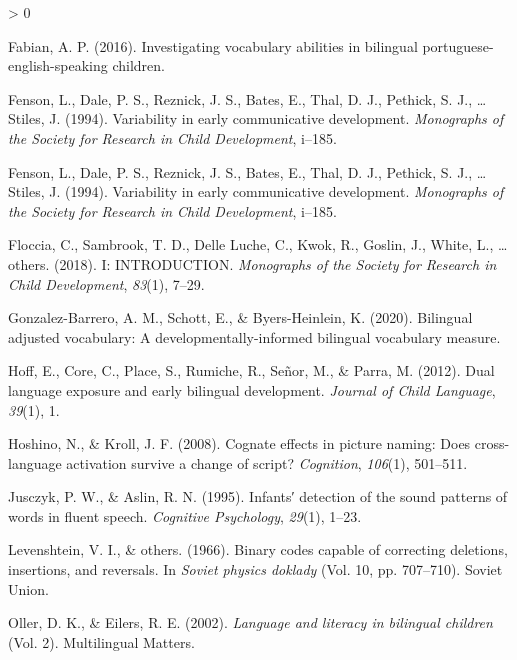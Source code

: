 \documentclass[
  english,
  man,man,floatsintext]{apa6}
\newlength{\cslhangindent}
\newenvironment{CSLReferences}[2] %
 {%
  \setlength{\parindent}{0pt}
  \ifodd #1 \everypar{\setlength{\hangindent}{\cslhangindent}}\ignorespaces\fi
  \ifnum #2 > 0
  \setlength{\parskip}{#2\baselineskip}
  \fi
 }%
 {}
\begin{document}
\begin{CSLReferences}{1}{0}
\leavevmode\hypertarget{ref-fabian2016investigating}{}%
Fabian, A. P. (2016). Investigating vocabulary abilities in bilingual portuguese-english-speaking children.

\leavevmode\hypertarget{ref-fenson1994variability}{}%
Fenson, L., Dale, P. S., Reznick, J. S., Bates, E., Thal, D. J., Pethick, S. J., \ldots{} Stiles, J. (1994). Variability in early communicative development. \emph{Monographs of the Society for Research in Child Development}, i--185.

\leavevmode\hypertarget{ref-fenson1994variability}{}%
Fenson, L., Dale, P. S., Reznick, J. S., Bates, E., Thal, D. J., Pethick, S. J., \ldots{} Stiles, J. (1994). Variability in early communicative development. \emph{Monographs of the Society for Research in Child Development}, i--185.

\leavevmode\hypertarget{ref-floccia2018introduction}{}%
Floccia, C., Sambrook, T. D., Delle Luche, C., Kwok, R., Goslin, J., White, L., \ldots{} others. (2018). I: INTRODUCTION. \emph{Monographs of the Society for Research in Child Development}, \emph{83}(1), 7--29.

\leavevmode\hypertarget{ref-gonzalez2020bilingual}{}%
Gonzalez-Barrero, A. M., Schott, E., \& Byers-Heinlein, K. (2020). Bilingual adjusted vocabulary: A developmentally-informed bilingual vocabulary measure.

\leavevmode\hypertarget{ref-hoff2012dual}{}%
Hoff, E., Core, C., Place, S., Rumiche, R., Señor, M., \& Parra, M. (2012). Dual language exposure and early bilingual development. \emph{Journal of Child Language}, \emph{39}(1), 1.

\leavevmode\hypertarget{ref-hoshino2008cognate}{}%
Hoshino, N., \& Kroll, J. F. (2008). Cognate effects in picture naming: Does cross-language activation survive a change of script? \emph{Cognition}, \emph{106}(1), 501--511.

\leavevmode\hypertarget{ref-jusczyk1995infants}{}%
Jusczyk, P. W., \& Aslin, R. N. (1995). Infants′ detection of the sound patterns of words in fluent speech. \emph{Cognitive Psychology}, \emph{29}(1), 1--23.

\leavevmode\hypertarget{ref-levenshtein1966binary}{}%
Levenshtein, V. I., \& others. (1966). Binary codes capable of correcting deletions, insertions, and reversals. In \emph{Soviet physics doklady} (Vol. 10, pp. 707--710). Soviet Union.

\leavevmode\hypertarget{ref-oller2002language}{}%
Oller, D. K., \& Eilers, R. E. (2002). \emph{Language and literacy in bilingual children} (Vol. 2). Multilingual Matters.


\end{CSLReferences}
\end{document}
